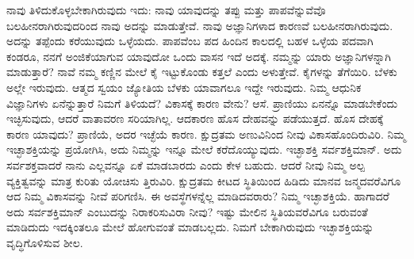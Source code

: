 ನಾವು ತಿಳಿದುಕೊಳ್ಳಬೇಕಾಗಿರುವುದು ಇದು: ನಾವು ಯಾವುದನ್ನು ತಪ್ಪು ಮತ್ತು ಪಾಪವೆನ್ನುವೆವೊ ಬಲಹೀನರಾಗಿರುವುದರಿಂದ ನಾವು ಅದನ್ನು ಮಾಡುತ್ತೇವೆ. ನಾವು ಅಜ್ಞಾನಿಗಳಾದ ಕಾರಣವೆ ಬಲಹೀನರಾಗಿರುವುದು. ಅದನ್ನು ತಪ್ಪೆಂದು ಕರೆಯುವುದು ಒಳ್ಳೆಯದು. ಪಾಪವೆಂಬ ಪದ ಹಿಂದಿನ ಕಾಲದಲ್ಲಿ ಬಹಳ ಒಳ್ಳೆಯ ಪದವಾಗಿ ಕಂಡರೂ, ನನಗೆ ಅಂಜಿಕೆಯಾಗುವ ಯಾವುದೋ ಒಂದು ವಾಸನ ಇದೆ ಅದಕ್ಕೆ. ನಮ್ಮನ್ನು ಯಾರು ಅಜ್ಞಾನಿಗಳನ್ನಾಗಿ ಮಾಡುತ್ತಾರೆ? ನಾವೆ ನಮ್ಮ ಕಣ್ಣಿನ ಮೇಲೆ ಕೈ ಇಟ್ಟುಕೊಂಡು ಕತ್ತಲೆ ಎಂದು ಅಳುತ್ತೇವೆ. ಕೈಗಳನ್ನು ತೆಗೆಯಿರಿ. ಬೆಳಕು ಅಲ್ಲೇ ಇರುವುದು. ಆತ್ಮದ ಸ್ವಯಂ ಜ್ಯೋತಿಯ ಬೆಳಕು ಯಾವಾಗಲೂ ಇದ್ದೇ ಇರುವುದು. ನಿಮ್ಮ ಆಧುನಿಕ ವಿಜ್ಞಾನಿಗಳು ಏನೆನ್ನುತ್ತಾರೆ ನಿಮಗೆ ತಿಳಿಯದೆ? ವಿಕಾಸಕ್ಕೆ ಕಾರಣ ವೇನು? ಆಸೆ. ಪ್ರಾಣಿಯು ಏನನ್ನೊ ಮಾಡಬೇಕೆಂದು ಇಚ್ಛಿಸುವುದು, ಆದರೆ ವಾತಾವರಣ ಸರಿಯಾಗಿಲ್ಲ. ಆದಕಾರಣ ಹೊಸ ದೇಹವನ್ನು ಪಡೆಯುತ್ತದೆ. ಹೊಸ ದೇಹಕ್ಕೆ ಕಾರಣ ಯಾವುದು? ಪ್ರಾಣಿಯೆ, ಅದರ ಇಚ್ಛೆಯೆ ಕಾರಣ. ಕ್ಷುದ್ರತಮ ಅಣುವಿನಿಂದ ನೀವು ವಿಕಾಸಹೊಂದಿರುವಿರಿ. ನಿಮ್ಮ ಇಚ್ಛಾಶಕ್ತಿಯನ್ನು ಪ್ರಯೋಗಿಸಿ, ಅದು ನಿಮ್ಮನ್ನು ಇನ್ನೂ ಮೇಲೆ ಕರೆದೊಯ್ಯುವುದು. ಇಚ್ಛಾಶಕ್ತಿ ಸರ್ವಶಕ್ತಿಮಾನ್​. ಅದು ಸರ್ವಶಕ್ತವಾದರೆ ನಾನು ಎಲ್ಲವನ್ನೂ ಏಕೆ ಮಾಡಬಾರದು ಎಂದು ಕೇಳ ಬಹುದು. ಆದರೆ ನೀವು ನಿಮ್ಮ ಅಲ್ಪ ವ್ಯಕ್ತಿತ್ವವನ್ನು ಮಾತ್ರ ಕುರಿತು ಯೋಚಿಸು ತ್ತಿರುವಿರಿ. ಕ್ಷುದ್ರತಮ ಕೀಟದ ಸ್ಥಿತಿಯಿಂದ ಹಿಡಿದು ಮಾನವ ಜನ್ಮದವರೆವಿಗೂ ಆದ ನಿಮ್ಮ ವಿಕಾಸವನ್ನು ನೀವೆ ಪರಿಗಣಿಸಿ. ಈ ಅವಸ್ಥೆಗಳನ್ನೆಲ್ಲ ಮಾಡಿದವರಾರು? ನಿಮ್ಮ ಇಚ್ಛಾಶಕ್ತಿಯೆ. ಹಾಗಾದರೆ ಅದು ಸರ್ವಶಕ್ತಿಮಾನ್​ ಎಂಬುದನ್ನು ನಿರಾಕರಿಸುವಿರಾ ನೀವು? ಇಷ್ಟು ಮೇಲಿನ ಸ್ಥಿತಿಯವರೆವಿಗೂ ಬರುವಂತೆ ಮಾಡಿದುದು ಇದಕ್ಕಿಂತಲೂ ಮೇಲೆ ಹೋಗುವಂತೆ ಮಾಡಬಲ್ಲದು. ನಿಮಗೆ ಬೇಕಾಗಿರುವುದು ಇಚ್ಛಾಶಕ್ತಿಯನ್ನು ವೃದ್ಧಿಗೊಳಿಸುವ ಶೀಲ.

